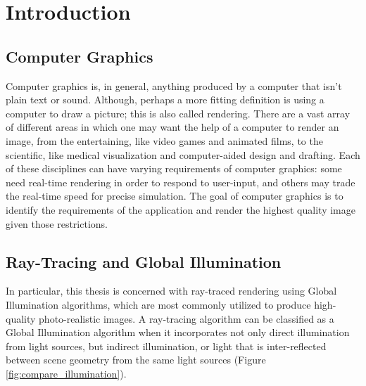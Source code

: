 \chapter{Introduction}

\section{Computer Graphics}
Computer graphics is, in general, anything produced by a computer that isn't plain text or sound. Although, perhaps a more fitting definition is using a computer to draw a picture; this is also called rendering. There are a vast array of different areas in which one may want the help of a computer to render an image, from the entertaining, like video games and animated films, to the scientific, like medical visualization and computer-aided design and drafting. Each of these disciplines can have varying requirements of computer graphics: some need real-time rendering in order to respond to user-input, and others may trade the real-time speed for precise simulation. The goal of computer graphics is to identify the requirements of the application and render the highest quality image given those restrictions.

\section{Ray-Tracing and Global Illumination}
\label{sec:ray_tracing_intro}
In particular, this thesis is concerned with ray-traced rendering using Global Illumination algorithms, which are most commonly utilized to produce high-quality photo-realistic images. A ray-tracing algorithm can be classified as a Global Illumination algorithm when it incorporates not only direct illumination from light sources, but indirect illumination, or light that is inter-reflected between scene geometry from the same light sources (Figure \ref{fig:compare_illumination}).


